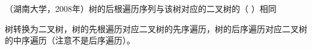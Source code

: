 \question （湖南大学，2008年）树的后根遍历序列与该树对应的二叉树的（ ）相同
\par{}
\begin{solution}树转换为二叉树，树的先根遍历对应二叉树的先序遍历，树的后序遍历对应二叉树的中序遍历（注意不是后序遍历）。
\end{solution}
